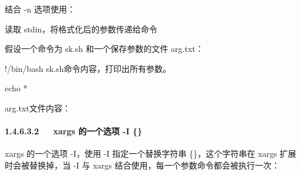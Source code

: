\documentclass[letterpaper,12pt,english]{sphinxmanual}
\begin{document}
\begin{sphinxVerbatim}[commandchars=\\\{\}]

   
\end{sphinxVerbatim}

结合 -n 选项使用：

\begin{sphinxVerbatim}[commandchars=\\\{\}]

 
 
\end{sphinxVerbatim}

读取 stdin，将格式化后的参数传递给命令

假设一个命令为 sk.sh 和一个保存参数的文件 arg.txt：

\begin{sphinxVerbatim}[commandchars=\\\{\}]
\PYGZsh{}!/bin/bash
\PYGZsh{}sk.sh命令内容，打印出所有参数。

echo \PYGZdl{}*
\end{sphinxVerbatim}

arg.txt文件内容：

\begin{sphinxVerbatim}[commandchars=\\\{\}]

\end{sphinxVerbatim}


\paragraph{1.4.6.3.2   xargs 的一个选项 -I \{\}}
\label{\detokenize{001software/001install/linux:xargs-i}}
xargs 的一个选项 -I，使用 -I 指定一个替换字符串
\{\}，这个字符串在 xargs 扩展时会被替换掉，当 -I 与
xargs 结合使用，每一个参数命令都会被执行一次：

\begin{sphinxVerbatim}[commandchars=\\\{\}]

  
  
  
\end{sphinxVerbatim}
\end{document}
